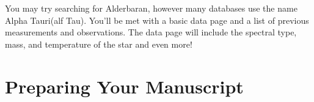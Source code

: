 \documentclass[Journal]{article}
\begin{document}
You may try searching for Alderbaran, however many databases use the name Alpha Tauri(alf Tau). You'll be met with a basic data page and a list of previous measurements and observations. The data page will include the spectral type, mass, and temperature of the star and even more!

\section{Preparing Your Manuscript}
\end{document}
